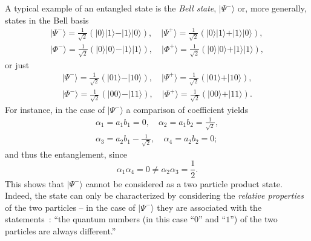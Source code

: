 {\color{blue}
\bexample
\label{bellstate1}
A typical example of an entangled state is the
{\em Bell state},   $\vert \Psi^- \rangle$
or, more generally, states in the Bell basis  
\begin{equation}
\begin{split}
\vert \Psi^- \rangle = \frac{1}{\sqrt{2}}\left(\vert 0 \rangle \vert 1 \rangle - \vert 1 \rangle \vert 0 \rangle  \right),  \quad
\vert \Psi^+ \rangle = \frac{1}{\sqrt{2}}\left(\vert 0 \rangle \vert 1 \rangle + \vert 1 \rangle \vert 0 \rangle  \right),\\
\vert \Phi^- \rangle = \frac{1}{\sqrt{2}}\left(\vert 0 \rangle \vert 0 \rangle - \vert 1 \rangle \vert 1 \rangle  \right),   \quad
\vert \Phi^+ \rangle = \frac{1}{\sqrt{2}}\left(\vert 0 \rangle \vert 0 \rangle + \vert 1 \rangle \vert 1 \rangle  \right),
\end{split}
\label{2014-m-ch-fdvs-bellbasis}
\end{equation}
or just
\begin{equation}
\begin{split}
\vert \Psi^- \rangle = \frac{1}{\sqrt{2}}\left(\vert 0   1 \rangle - \vert 1   0 \rangle  \right), \quad
\vert \Psi^+ \rangle = \frac{1}{\sqrt{2}}\left(\vert 0   1 \rangle + \vert 1   0 \rangle  \right),\\
\vert \Phi^- \rangle = \frac{1}{\sqrt{2}}\left(\vert 0   0 \rangle - \vert 1   1 \rangle  \right), \quad
\vert \Phi^+ \rangle = \frac{1}{\sqrt{2}}\left(\vert 0   0 \rangle + \vert 1   1 \rangle  \right).
\end{split}
\label{2014-m-ch-fdvs-bellbasis2}
\end{equation}
For instance, in the case of $\vert \Psi^- \rangle$ a comparison of coefficient yields
\begin{equation}
\begin{split}
\alpha_1=a_1b_1=0, \quad
\alpha_2=a_1b_2=\frac{1}{\sqrt{2}},\\
\alpha_3=a_2b_1-\frac{1}{\sqrt{2}}, \quad
\alpha_4=a_2b_2=0;
\end{split}
\label{2012-m-ch-fdvs-BellSCC}
\end{equation}
and thus
the entanglement, since
\begin{equation}
{\alpha_1}{\alpha_4}=0 \neq {\alpha_2}{\alpha_3}=\frac{1}{2}.
\end{equation}
This shows that  $\vert \Psi^- \rangle$ cannot be considered as a two particle product state.
Indeed, the state can only be characterized by considering the {\em relative properties}
of the two particles --
in the case of  $\vert \Psi^- \rangle$ they are associated with the statements~\cite{zeil-99}:
``the quantum numbers (in this case ``$0$'' and ``$1$'') of the two particles are always different.''

\eexample
}



